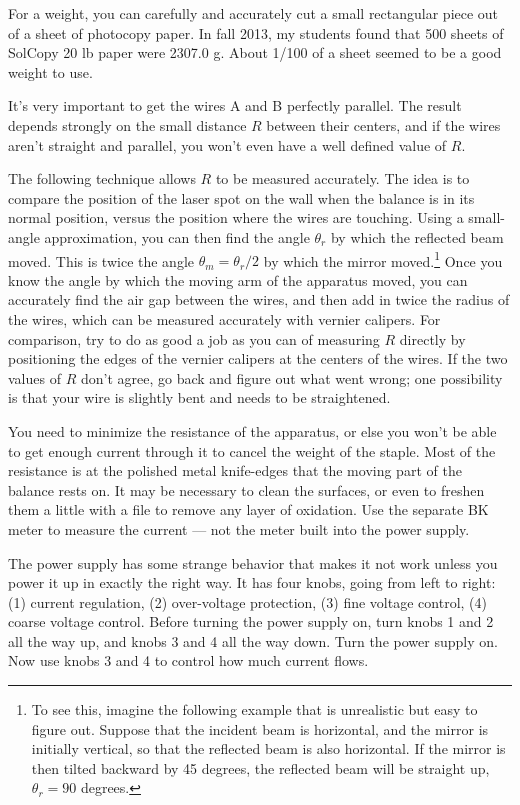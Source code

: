 For a weight, you can carefully and accurately cut a small rectangular piece
out of a sheet of photocopy paper. In fall 2013, my students found that 500
sheets of SolCopy 20 lb paper were 2307.0 g. About 1/100 of a sheet seemed to
be a good weight to use.

It's very important to get the wires A and B perfectly parallel. The result
depends strongly on the small distance $R$ between their centers, and if the
wires aren't straight and parallel, you won't even have a well defined value
of $R$. 

The following
technique allows $R$ to be measured accurately.
The idea is to compare the position
of the laser spot on the wall when the balance is in its normal position, versus
the position where the wires are touching. Using a small-angle approximation, you can then find
the angle $\theta_r$ by which the reflected beam moved. This is twice the angle
$\theta_m=\theta_r/2$ by which the mirror moved.\footnote{To see this, imagine the following
example that is unrealistic but easy to figure out. Suppose that
the incident beam is horizontal, and the mirror is initially vertical, so that the reflected
beam is also horizontal. If the mirror is then tilted backward by 45 degrees, the reflected
beam will be straight up, $\theta_r=90$ degrees.}
Once you know the angle by which the moving arm of the apparatus moved, you can accurately
find the air gap between the wires, and then add in twice the radius of the wires, which can
be measured accurately with vernier calipers. For comparison, try to do as good a job as
you can of measuring $R$ directly by positioning the edges of the vernier calipers at the
centers of the wires. If the two values of $R$ don't agree, go back and figure out what
went wrong; one possibility is that your wire is slightly bent and needs to be straightened.

You need to minimize the resistance of the apparatus, or else you won't be
able to get enough current through it to cancel the weight of the staple.
Most of the resistance is at the polished metal knife-edges that the
moving part of the balance rests on. It may be necessary to clean the
surfaces, or even to freshen them a little with a file to remove any layer
of oxidation. Use the separate BK meter to measure the current --- not the
meter built into the power supply.

The power supply has some strange behavior that makes it not work unless
you power it up in exactly the right way. It has four knobs, going from
left to right: (1) current regulation, (2) over-voltage protection, (3)
fine voltage control, (4) coarse voltage control. Before turning the power
supply on, turn knobs 1 and 2 all the way up, and knobs 3 and 4 all the way
down. Turn the power supply on. Now use knobs 3 and 4 to control how much
current flows.

